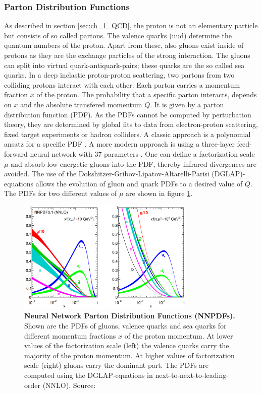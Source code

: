 \subsubsection*{Parton Distribution Functions}
As described in section \ref{sec:ch_1_QCD}, the proton is not an elementary particle but consists of so called partons. The valence quarks (uud) determine the quantum numbers of the proton. Apart from these, also gluons exist inside of protons as they are the exchange particles of the strong interaction. The gluons can split into virtual quark-antiquark-pairs; these quarks are the so called sea quarks. In a deep inelastic proton-proton scattering, two partons from two colliding protons interact with each other. Each parton carries a momentum fraction $x$ of the proton. The probability that a specific parton interacts, depends on $x$ and the absolute transfered momentum $Q$. It is given by a parton distribution function (PDF). As the PDFs cannot be computed by perturbation theory, they are determined by global fits to data from electron-proton scattering, fixed target experiments or hadron colliders. A classic approach is a polynomial ansatz for a specific PDF \cite{pdfOld}. A more modern approach is using a three-layer feed-forward neural network with 37 parameters \cite{nnpdf}. One can define a factorization scale $\mu$ and absorb low energetic gluons into the PDF, thereby infrared divergences are avoided. The use of the Dokshitzer-Gribov-Lipatov-Altarelli-Parisi (DGLAP)-equations \cite{DGLAP1,DGLAP2,DGLAP3} allows the evolution of gluon and quark PDFs to a desired value of $Q$. The PDFs for two different values of $\mu$ are shown in figure \ref{fig:ch_3_pdfs}.

\begin{figure}
\includegraphics[width=0.75\textwidth]{assets/nnpdfs.png}
\caption[Parton Distribution Functions]{\textbf{Neural Network Parton Distribution Functions (NNPDFs).} Shown are the PDFs of gluons, valence quarks and sea quarks for different momentum fractions $x$ of the proton momentum. At lower values of the factorization scale (left) the valence quarks carry the majority of the proton momentum. At higher values of factorization scale (right) gluons carry the dominant part. The PDFs are computed using the DGLAP-equations in next-to-next-to-leading-order (NNLO). Source: \cite{nnpdf}}
   \label{fig:ch_3_pdfs}
\end{figure}

